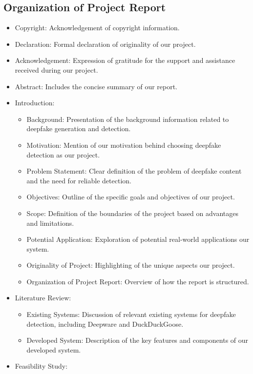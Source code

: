 \subsection{Organization of Project Report}
\begin{itemize}
    \item Copyright: Acknowledgement of copyright information.
    \item Declaration: Formal declaration of originality of our project.
    \item Acknowledgement: Expression of gratitude for the support and assistance received during our project.
    \item Abstract: Includes the concise summary of our report.
    \item Introduction:
      \begin{itemize}
        \item Background: Presentation of the background information related to deepfake generation and detection.
        \item Motivation: Mention of our motivation behind choosing deepfake detection as our project.
        \item Problem Statement: Clear definition of the problem of deepfake content and the need for reliable detection.
        \item Objectives: Outline of the specific goals and objectives of our project.
        \item Scope: Definition of the boundaries of the project based on advantages and limitations.
        \item Potential Application: Exploration of potential real-world applications our system.
        \item Originality of Project: Highlighting of the unique aspects our project.
        \item Organization of Project Report: Overview of how the report is structured.
      \end{itemize}
    \item Literature Review:
      \begin{itemize}
        \item Existing Systems: Discussion of relevant existing systems for deepfake detection, including Deepware and DuckDuckGoose.
        \item Developed System: Description of the key features and components of our  developed system.
      \end{itemize}
    \item Feasibility Study:

\end{itemize}
